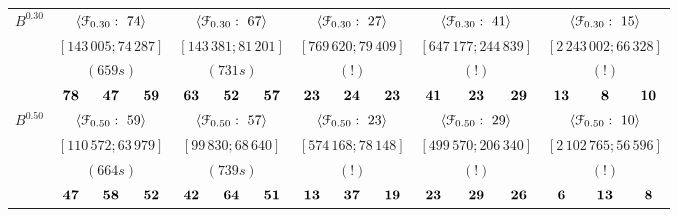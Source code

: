 \documentclass[12pt]{article}
\theoremstyle{thmstyleone}%
\theoremstyle{definition}
\begin{document}
\begin{table}[!ht]
\begin{tabular}{| l | c c c  | c c c | c c c | c c c | c c c | }
\textbf{$B^{0.30}$}& \multicolumn{3}{c|}{$\langle \EuScript{F}_{0.30}:~74 \rangle$ }& \multicolumn{3}{c|}{$\langle \EuScript{F}_{0.30}:~67 \rangle$ }& \multicolumn{3}{c|}{$\langle \EuScript{F}_{0.30}:~27 \rangle$ }& \multicolumn{3}{c|}{$\langle \EuScript{F}_{0.30}:~41 \rangle$ }& \multicolumn{3}{c|}{$\langle \EuScript{F}_{0.30}:~15 \rangle$ } \\
& \multicolumn{3}{c|}{$[143\,005; 74\,287]$}& \multicolumn{3}{c|}{$[143\,381; 81\,201]$}& \multicolumn{3}{c|}{$[769\,620; 79\,409]$}& \multicolumn{3}{c|}{$[647\,177; 244\,839]$}& \multicolumn{3}{c|}{$[2\,243\,002; 66\,328]$} \\
& \multicolumn{3}{c|}{$(659s)$}& \multicolumn{3}{c|}{$(731s)$}& \multicolumn{3}{c|}{$(!)$}& \multicolumn{3}{c|}{$(!)$}& \multicolumn{3}{c|}{$(!)$} \\ \hline
& $\bf 78$ & $\bf 47$ & $\bf 59$ & $\bf 63$ & $\bf 52$ & $\bf 57$ & $\bf 23$ & $\bf 24$ & $\bf 23$ & $\bf 41$ & $\bf 23$ & $\bf 29$ & $\bf 13$ & $\bf 8$ & $\bf 10$ \\

\textbf{$B^{0.50}$}& \multicolumn{3}{c|}{$\langle \EuScript{F}_{0.50}:~59 \rangle$ }& \multicolumn{3}{c|}{$\langle \EuScript{F}_{0.50}:~57 \rangle$ }& \multicolumn{3}{c|}{$\langle \EuScript{F}_{0.50}:~23 \rangle$ }& \multicolumn{3}{c|}{$\langle \EuScript{F}_{0.50}:~29 \rangle$ }& \multicolumn{3}{c|}{$\langle \EuScript{F}_{0.50}:~10 \rangle$ } \\
& \multicolumn{3}{c|}{$[110\,572; 63\,979]$}& \multicolumn{3}{c|}{$[99\,830; 68\,640]$}& \multicolumn{3}{c|}{$[574\,168; 78\,148]$}& \multicolumn{3}{c|}{$[499\,570; 206\,340]$}& \multicolumn{3}{c|}{$[2\,102\,765; 56\,596]$} \\
& \multicolumn{3}{c|}{$(664s)$}& \multicolumn{3}{c|}{$(739s)$}& \multicolumn{3}{c|}{$(!)$}& \multicolumn{3}{c|}{$(!)$}& \multicolumn{3}{c|}{$(!)$} \\ \hline
& $\bf 47$ & $\bf 58$ & $\bf 52$ & $\bf 42$ & $\bf 64$ & $\bf 51$ & $\bf 13$ & $\bf 37$ & $\bf 19$ & $\bf 23$ & $\bf 29$ & $\bf 26$ & $\bf 6$ & $\bf 13$ & $\bf 8$ \\


\end{tabular}
\end{table}
\end{document}
